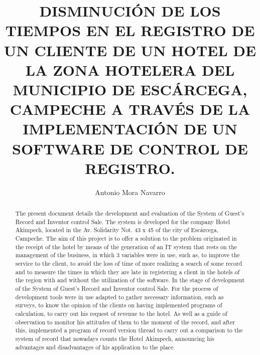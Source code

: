 \documentclass{comjnl}
\begin{document}
\title[ARTICULO DE INVESTIGACION]{DISMINUCIÓN DE LOS TIEMPOS EN EL REGISTRO DE UN CLIENTE DE UN HOTEL DE LA ZONA HOTELERA DEL MUNICIPIO DE ESCÁRCEGA, CAMPECHE A TRAVÉS DE LA IMPLEMENTACIÓN DE UN SOFTWARE DE CONTROL DE REGISTRO. }

\author{Antonio Mora Navarro}

 





\begin{abstract}
The present document details the development and evaluation of the System of Guest's Record and Inventor control Sale. The system is developed for the company Hotel Akimpech, located in the Av. Solidarity Not. 43 x 45 of the city of Escárcega, Campeche. The aim of this project is to offer a solution to the problem originated in the receipt of the hotel by means of the generation of an IT system that rests on the management of the business, in which 3 variables were in use, such as, to improve the service to the client, to avoid the loss of time of more realizing a search of some record and to measure the times in which they are late in registering a client in the hotels of the region with and without the utilization of the software. In the stage of development of the System of Guest's Record and Inventor control Sale. For the process of development tools were in use adapted to gather necessary information, such as surveys, to know the opinion of the clients on having implemented programs of calculation, to carry out his request of revenue to the hotel. As well as a guide of observation to monitor his attitudes of them to the moment of the record, and after this, implemented a program of record version thread to carry out a comparison to the system of record that nowadays counts the Hotel Akimpech, announcing his advantages and disadvantages of his application to the place.\\


\end{abstract}
\end{document}
